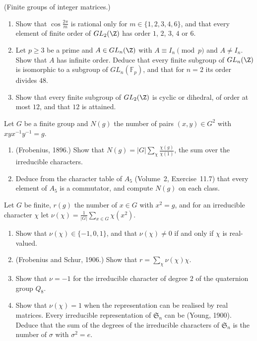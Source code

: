 \begin{exercise}[$\star\star\star$]\label{pb:glnz}
(Finite groups of integer matrices.)
\begin{enumerate}[label=(\alph*)]
\item Show that $\cos\frac{2\pi}m$ is rational only for $m\in\{1,2,3,4,6\}$, and that every element of finite order of
$GL_2(\Z)$ has order $1$, $2$, $3$, $4$ or $6$.
\item Let $p\ge3$ be a prime and $A\in GL_n(\Z)$ with $A\equiv I_n\pmod p$ and $A\ne I_n$. Show that $A$ has infinite order.
Deduce that every finite subgroup of $GL_n(\Z)$ is isomorphic to a subgroup of $GL_n(\mathbb F_p)$, and that for $n=2$ its
order divides $48$.
\item Show that every finite subgroup of $GL_2(\Z)$ is cyclic or dihedral, of order at most $12$, and that $12$ is attained.
\end{enumerate}
\end{exercise}

\begin{exercise}[$\star\star$]\label{pb:commutators}
Let $G$ be a finite group and $N(g)$ the number of pairs $(x,y)\in G^2$ with $xyx^{-1}y^{-1}=g$.
\begin{enumerate}[label=(\alph*)]
\item (Frobenius, 1896.) Show that $N(g)=|G|\sum_\chi\frac{\chi(g)}{\chi(1)}$, the sum over the irreducible characters.
\item Deduce from the character table of $A_5$ (Volume~2, Exercise~11.7) that every element of $A_5$ is a commutator,
and compute $N(g)$ on each class.
\end{enumerate}
\end{exercise}

\begin{exercise}[$\star\star\star$]\label{pb:frobschur}
Let $G$ be finite, $r(g)$ the number of $x\in G$ with $x^2=g$, and for an irreducible character $\chi$ let
$\nu(\chi)=\frac1{|G|}\sum_{x\in G}\chi(x^2)$.
\begin{enumerate}[label=(\alph*)]
\item Show that $\nu(\chi)\in\{-1,0,1\}$, and that $\nu(\chi)\ne0$ if and only if $\chi$ is real-valued.
\item (Frobenius and Schur, 1906.) Show that $r=\sum_\chi\nu(\chi)\chi$.
\item Show that $\nu=-1$ for the irreducible character of degree $2$ of the quaternion group $Q_8$.
\item Show that $\nu(\chi)=1$ when the representation can be realised by real matrices. Every irreducible representation of
$\mathfrak S_n$ can be (Young, 1900). Deduce that the sum of the degrees of the irreducible characters of $\mathfrak S_n$ is
the number of $\sigma$ with $\sigma^2=e$.
\end{enumerate}
\end{exercise}

